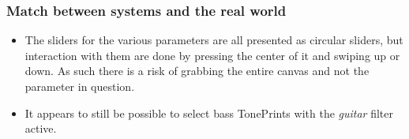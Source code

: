 \subsubsection{Match between systems and the real world}
\begin{itemize}
	\item The sliders for the various parameters are all presented as circular sliders, but interaction with them are done by pressing the center of it and swiping up or down. As such there is a risk of grabbing the entire canvas and not the parameter in question.\\
	\item It appears to still be possible to select bass TonePrints with the \textit{guitar} filter active.
\end{itemize}
%
%
